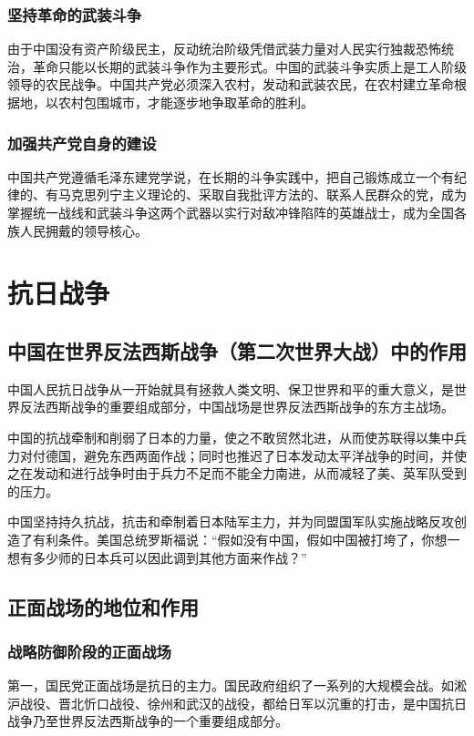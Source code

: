 \documentclass{article}
\begin{document}
\begin{CJK}{UTF8}{song}
\subsubsection{坚持革命的武装斗争}
由于中国没有资产阶级民主，反动统治阶级凭借武装力量对人民实行独裁恐怖统治，革命只能以长期的武装斗争作为主要形式。中国的武装斗争实质上是工人阶级领导的农民战争。中国共产党必须深入农村，发动和武装农民，在农村建立革命根据地，以农村包围城市，才能逐步地争取革命的胜利。
\subsubsection{加强共产党自身的建设}
中国共产党遵循毛泽东建党学说，在长期的斗争实践中，把自己锻炼成立一个有纪律的、有马克思列宁主义理论的、采取自我批评方法的、联系人民群众的党，成为掌握统一战线和武装斗争这两个武器以实行对敌冲锋陷阵的英雄战士，成为全国各族人民拥戴的领导核心。

\section{抗日战争}

\subsection{中国在世界反法西斯战争（第二次世界大战）中的作用}
中国人民抗日战争从一开始就具有拯救人类文明、保卫世界和平的重大意义，是世界反法西斯战争的重要组成部分，中国战场是世界反法西斯战争的东方主战场。

中国的抗战牵制和削弱了日本的力量，使之不敢贸然北进，从而使苏联得以集中兵力对付德国，避免东西两面作战；同时也推迟了日本发动太平洋战争的时间，并使之在发动和进行战争时由于兵力不足而不能全力南进，从而减轻了美、英军队受到的压力。

中国坚持持久抗战，抗击和牵制着日本陆军主力，并为同盟国军队实施战略反攻创造了有利条件。美国总统罗斯福说：“假如没有中国，假如中国被打垮了，你想一想有多少师的日本兵可以因此调到其他方面来作战？”
\subsection{正面战场的地位和作用}

\subsubsection{战略防御阶段的正面战场}
第一，国民党正面战场是抗日的主力。国民政府组织了一系列的大规模会战。如淞沪战役、晋北忻口战役、徐州和武汉的战役，都给日军以沉重的打击，是中国抗日战争乃至世界反法西斯战争的一个重要组成部分。


\end{CJK}
\end{document}
